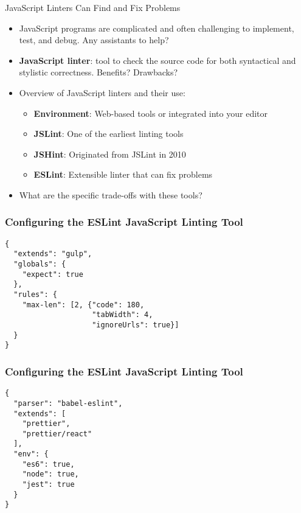 \documentclass[14pt,aspectratio=169]{beamer}
\begin{document}
%
\begin{frame}{JavaScript Linters Can Find and Fix Problems}
  \begin{itemize}
    \item JavaScript programs are complicated and often challenging to
      implement, test, and debug. Any assistants to help?
      \vspace*{-.15in}
    \item {\bf JavaScript linter}: tool to check the source code for both
      syntactical and stylistic correctness. Benefits? Drawbacks?
      \vspace*{-.35in}
    \item Overview of JavaScript linters and their use:
      \begin{itemize}
        \item {\bf Environment}: Web-based tools or integrated into your editor
        \item {\bf JSLint}: One of the earliest linting tools
        \item {\bf JSHint}: Originated from JSLint in 2010
        \item {\bf ESLint}: Extensible linter that can fix problems
      \end{itemize}
      \vspace*{-.25in}
    \item What are the specific trade-offs with these tools?
  \end{itemize}
\end{frame}

%
\begin{frame}[fragile]
  \frametitle{Configuring the ESLint JavaScript Linting Tool}
  \normalsize
  \begin{minipage}{6in}
    \vspace*{.2in}
    \begin{verbatim}
{
  "extends": "gulp",
  "globals": {
    "expect": true
  },
  "rules": {
    "max-len": [2, {"code": 180,
                    "tabWidth": 4,
                    "ignoreUrls": true}]
  }
}
    \end{verbatim}
  \end{minipage}
\end{frame}

%
\begin{frame}[fragile]
  \frametitle{Configuring the ESLint JavaScript Linting Tool}
  \normalsize
  \begin{minipage}{6in}
    \vspace*{.1in}
    \begin{verbatim}
{
  "parser": "babel-eslint",
  "extends": [
    "prettier",
    "prettier/react"
  ],
  "env": {
    "es6": true,
    "node": true,
    "jest": true
  }
}
    \end{verbatim}
  \end{minipage}
\end{frame}
\end{document}
